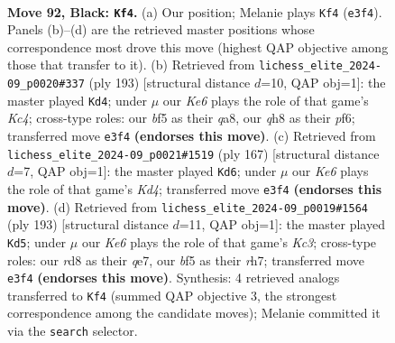 \documentclass[11pt]{article}
\begin{document}
\clearpage

\begin{figure}[p]\centering
\begin{subfigure}{0.46\textwidth}\centering
\resizebox{\linewidth}{!}{%
\newchessgame
\chessboard[
  setfen={3R3Q/5P2/8/5B2/8/4k3/8/7K b - - 2 92},
  showmover=false,
  pgfstyle=straightmove, color=movearrow, markmove={e3-f4}
]}
\caption{}
\end{subfigure}\hfill
\begin{subfigure}{0.46\textwidth}\centering
\resizebox{\linewidth}{!}{%
\newchessgame
\chessboard[
  setfen={QR6/5K2/5P2/2k5/8/8/8/8 b - - 0 97},
  showmover=false,
  pgfstyle=straightmove, color=movearrow, markmove={c5-d4}
]}
\caption{}
\end{subfigure}
\\[4pt]
\begin{subfigure}{0.46\textwidth}\centering
\resizebox{\linewidth}{!}{%
\newchessgame
\chessboard[
  setfen={8/8/1K6/3k4/8/4Q3/8/4R3 b - - 10 84},
  showmover=false,
  pgfstyle=straightmove, color=movearrow, markmove={d5-d6}
]}
\caption{}
\end{subfigure}\hfill
\begin{subfigure}{0.46\textwidth}\centering
\resizebox{\linewidth}{!}{%
\newchessgame
\chessboard[
  setfen={8/4Q2R/2k5/5K2/8/8/8/8 b - - 2 97},
  showmover=false,
  pgfstyle=straightmove, color=movearrow, markmove={c6-d5}
]}
\caption{}
\end{subfigure}
\caption{\textbf{Move 92, Black: \texttt{Kf4}.} (a) Our position; Melanie plays \texttt{Kf4} (\texttt{e3f4}). Panels (b)--(d) are the retrieved master positions whose correspondence most drove this move (highest QAP objective among those that transfer to it). (b) Retrieved from \texttt{lichess\_elite\_2024-09\_p0020\#337} (ply 193) [structural distance $d$=10, QAP obj=1]: the master played \texttt{Kd4}; under $\mu$ our \emph{Ke6} plays the role of that game's \emph{Kc4}; cross-type roles: our \emph{b}f5 as their \emph{q}a8, our \emph{q}h8 as their \emph{p}f6; transferred move \texttt{e3f4} \textbf{(endorses this move)}. (c) Retrieved from \texttt{lichess\_elite\_2024-09\_p0021\#1519} (ply 167) [structural distance $d$=7, QAP obj=1]: the master played \texttt{Kd6}; under $\mu$ our \emph{Ke6} plays the role of that game's \emph{Kd4}; transferred move \texttt{e3f4} \textbf{(endorses this move)}. (d) Retrieved from \texttt{lichess\_elite\_2024-09\_p0019\#1564} (ply 193) [structural distance $d$=11, QAP obj=1]: the master played \texttt{Kd5}; under $\mu$ our \emph{Ke6} plays the role of that game's \emph{Kc3}; cross-type roles: our \emph{r}d8 as their \emph{q}e7, our \emph{b}f5 as their \emph{r}h7; transferred move \texttt{e3f4} \textbf{(endorses this move)}. Synthesis: 4 retrieved analogs transferred to \texttt{Kf4} (summed QAP objective 3, the strongest correspondence among the candidate moves); Melanie committed it via the \texttt{search} selector.}
\label{fig:thought-m183}
\end{figure}
\end{document}
